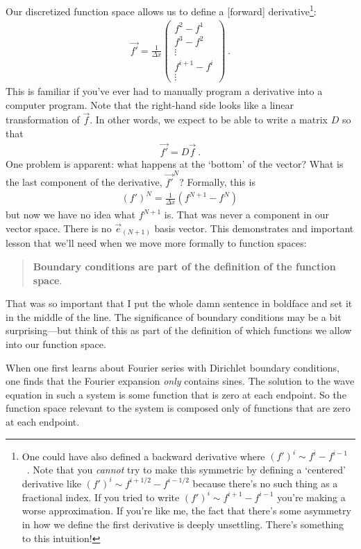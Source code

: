 Our discretized function space allows us to define a [forward] derivative\footnote{One could have also defined a backward derivative where $(f')^i \sim f^{i}-f^{i-1}$ \ . Note that you \emph{cannot} try to make this symmetric by defining a `centered' derivative like $(f')^i \sim f^{i+1/2}-f^{i-1/2}$ because there's no such thing as a fractional index. If you tried to write $(f')^i\sim f^{i+1}-f^{i-1}$ you're making a worse approximation. If you're like me, the fact that there's some asymmetry in how we define the first derivative is deeply unsettling. There's something to this intuition!}:
\begin{align}
  \vec{f'} =
  \frac{1}{\Delta x}
  \begin{pmatrix}
    f^2 - f^1 \\
    f^3 - f^2 \\
    \vdots
    \\
    f^{i+1}-f^i
    \\
    \vdots
  \end{pmatrix} \ .
\end{align}
This is familiar if you’ve ever had to manually program a derivative into a computer program. Note that the right-hand side looks like a linear transformation of $\vec{f}$. In other words, we expect to be able to write a matrix $D$ so that
\begin{align}
  \vec{f'} = D\vec{f} \ .
\end{align}
One problem is apparent: what happens at the `bottom’ of the vector? What is the last component of the derivative, $\vec{f'}^N$? Formally, this is
\begin{align}
  {(f')}^N = \frac{1}{\Delta x}(f^{N+1} - f^N) \,
\end{align}
but now we have no idea what $f^{N+1}$ is. That was never a component in our vector space. There is no $\vec{e}_{(N+1)}$ basis vector. 
%
This demonstrates and important lesson that we’ll need when we move more formally to function spaces:
\begin{quote}
\textbf{Boundary conditions are part of the definition of the function space}.   
\end{quote}
That was so important that I put the whole damn sentence in boldface and set it in the middle of the line. The significance of boundary conditions may be a bit surprising---but think of this as part of the definition of which functions we allow into our function space. 
%
\begin{example}
When one first learns about Fourier series with Dirichlet boundary conditions, one finds that the Fourier expansion \emph{only} contains sines. The solution to the wave equation in such a system is some function that is zero at each endpoint. So the function space relevant to the system is composed only of functions that are zero at each endpoint.
\end{example}

